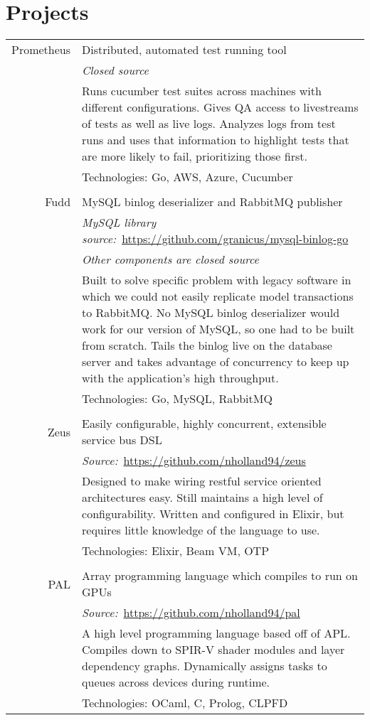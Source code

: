 \documentclass[a4paper,10pt]{article}
\begin{document}
\section{Projects}
\begin{tabular}{r|p{11cm}}
  Prometheus  & Distributed, automated test running tool\\
              & \emph{Closed source}\\
              & \footnotesize{Runs cucumber test suites across machines with different configurations. Gives QA access to livestreams of tests as well as live logs. Analyzes logs from test runs and uses that information to highlight tests that are more likely to fail, prioritizing those first.}\\
              & \footnotesize{Technologies: Go, AWS, Azure, Cucumber}\\
  \multicolumn{2}{c}{}\\
  Fudd        & MySQL binlog deserializer and RabbitMQ publisher\\
              & \emph{MySQL library source:}\ \href{https://github.com/granicus/mysql-binlog-go}{https://github.com/granicus/mysql-binlog-go}\\
              & \emph{Other components are closed source}\\
              & \footnotesize{Built to solve specific problem with legacy software in which we could not easily replicate model transactions to RabbitMQ. No MySQL binlog deserializer would work for our version of MySQL, so one had to be built from scratch. Tails the binlog live on the database server and takes advantage of concurrency to keep up with the application's high throughput.}\\
              & \footnotesize{Technologies: Go, MySQL, RabbitMQ}\\
  \multicolumn{2}{c}{}\\
  Zeus        & Easily configurable, highly concurrent, extensible service bus DSL\\
              & \emph{Source:}\ \href{https://github.com/nholland94/zeus}{https://github.com/nholland94/zeus}\\
              & \footnotesize{Designed to make wiring restful service oriented architectures easy. Still maintains a high level of configurability. Written and configured in Elixir, but requires little knowledge of the language to use.}\\
              & \footnotesize{Technologies: Elixir, Beam VM, OTP}\\
  \multicolumn{2}{c}{}\\
  PAL         & Array programming language which compiles to run on GPUs\\
              & \emph{Source:}\ \href{https://github.com/nholland94/pal}{https://github.com/nholland94/pal}\\
              & \footnotesize{A high level programming language based off of APL. Compiles down to SPIR-V shader modules and layer dependency graphs. Dynamically assigns tasks to queues across devices during runtime.}\\
              & \footnotesize{Technologies: OCaml, C, Prolog, CLPFD}\\
\end{tabular}
\end{document}

